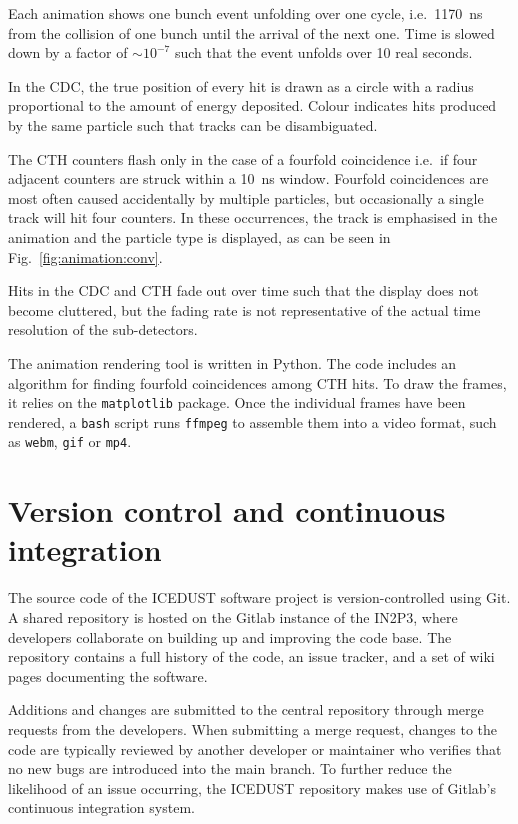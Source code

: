 Each animation shows one bunch event unfolding over one cycle, i.e.\ \SI{1170}{\ns} from the collision of one bunch until the arrival of the next one. Time is slowed down by a factor of ${\sim}10^{-7}$ such that the event unfolds over 10 real seconds.

In the CDC, the true position of every hit is drawn as a circle with a radius proportional to the amount of energy deposited. Colour indicates hits produced by the same particle such that tracks can be disambiguated.

The CTH counters flash only in the case of a fourfold coincidence i.e.\ if four adjacent counters are struck within a \SI{10}{\ns} window.
Fourfold coincidences are most often caused accidentally by multiple particles, but occasionally a single track will hit four counters. In these occurrences, the track is emphasised in the animation and the particle type is displayed, as can be seen in Fig.~\ref{fig:animation:conv}.

Hits in the CDC and CTH fade out over time such that the display does not become cluttered, but the fading rate is not representative of the actual time resolution of the sub-detectors.

The animation rendering tool is written in Python. The code includes an algorithm for finding fourfold coincidences among CTH hits. To draw the frames, it relies on the \texttt{matplotlib} package. Once the individual frames have been rendered, a \texttt{bash} script runs \texttt{ffmpeg} to assemble them into a video format, such as \texttt{webm}, \texttt{gif} or \texttt{mp4}.


\section{Version control and continuous integration}

The source code of the ICEDUST software project is version-controlled using Git. A shared repository is hosted on the Gitlab instance of the IN2P3, where developers collaborate on building up and improving the code base. The repository contains a full history of the code, an issue tracker, and a set of wiki pages documenting the software. 

Additions and changes are submitted to the central repository through merge requests from the developers.
When submitting a merge request, changes to the code are typically reviewed by another developer or maintainer who verifies that no new bugs are introduced into the main branch. To further reduce the likelihood of an issue occurring, the ICEDUST repository makes use of Gitlab's continuous integration system.

